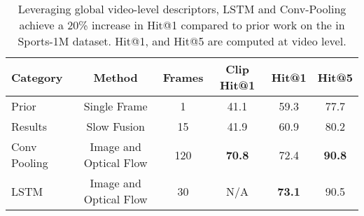\documentclass[10pt,twocolumn,letterpaper]{article}
\begin{document}
\begin{table}
\begin{center}
\end{center}
\vspace{-1em}
\caption{Optical flow is noisy on Sports-1M and if used alone, results in lower
performance than equivalent image-models. However, if used in conjunction with
raw image features, optical flow benefits LSTM. Experiments performed on
30-frame models using GoogLeNet CNNs.} \label{table:sports-optflow}
\end{table}

\begin{table*}
\begin{center}
\begin{tabular}{|l|c|c|c|c|c|}
\hline
Category & Method & Frames & Clip Hit@1 & Hit@1 & Hit@5\\
\hline\hline
Prior & Single Frame & 1 & 41.1 & 59.3 & 77.7 \\
Results \cite{karpathy2014large} & Slow Fusion & 15 & 41.9 & 60.9 & 80.2 \\
\hline
Conv Pooling & Image and Optical Flow & 120 & {\bf 70.8} & 72.4 & {\bf 90.8} \\
\hline
LSTM & Image and Optical Flow & 30 & N/A & {\bf 73.1} & 90.5 \\
\hline
\end{tabular}
\vspace{-1em}
\caption{Leveraging global video-level descriptors, LSTM and Conv-Pooling
  achieve a 20\% increase in Hit@1 compared to prior work on the in Sports-1M
dataset. Hit@1, and Hit@5 are computed at video level.} \label{table:sports_results}
\end{center}
\vspace{-2em}
\end{table*}
\end{document}

